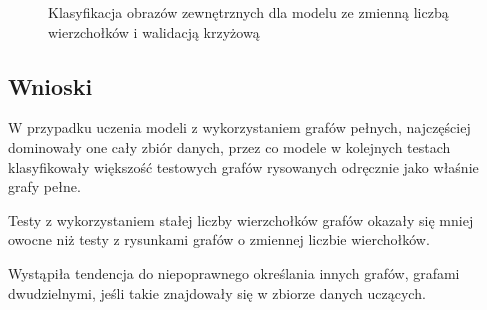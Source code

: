 \begin{figure}[ht]
	\centering
	\caption{Klasyfikacja obrazów zewnętrznych dla modelu ze zmienną liczbą wierzchołków i walidacją krzyżową}
	\label{Fig:tests-csvar-2}
\end{figure}
\FloatBarrier

\subsection{Wnioski}
W przypadku uczenia modeli z wykorzystaniem grafów pełnych, najczęściej dominowały one cały zbiór danych,
przez co modele w kolejnych testach klasyfikowały większość testowych grafów rysowanych odręcznie jako właśnie grafy pełne.

Testy z wykorzystaniem stałej liczby wierzchołków grafów okazały się mniej owocne niż testy z rysunkami grafów
o zmiennej liczbie wierchołków.

Wystąpiła tendencja do niepoprawnego określania innych grafów, grafami dwudzielnymi, jeśli takie znajdowały się
w zbiorze danych uczących.